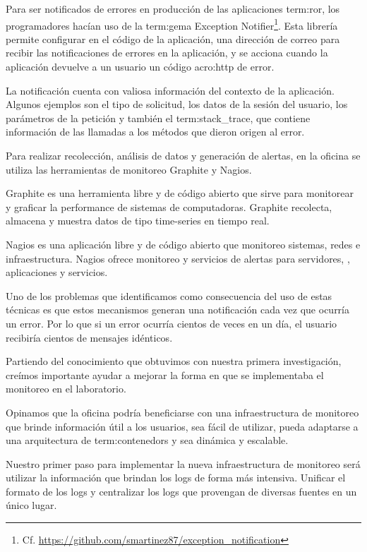 Para ser notificados de errores en producción de las aplicaciones
\gls{term:ror}, los programadores hacían uso de la \gls{term:gema} Exception
Notifier\footnote{Cf.
\url{https://github.com/smartinez87/exception_notification}}. Esta librería
permite configurar en el código de la aplicación, una dirección de correo para
recibir las notificaciones de errores en la aplicación, y se acciona cuando la
aplicación devuelve a un usuario un código \gls{acro:http} de error.

La notificación cuenta con valiosa información del contexto de la aplicación.
Algunos ejemplos son el tipo de solicitud, los datos de la sesión del usuario,
los parámetros de la petición y también el \gls{term:stack_trace}, que contiene
información de las llamadas a los métodos que dieron origen al error.

Para realizar recolección, análisis de datos y generación de alertas, en la
oficina se utiliza las herramientas de monitoreo Graphite y Nagios.

Graphite es una herramienta libre y de código abierto que sirve para monitorear
y graficar la performance de sistemas de computadoras. Graphite recolecta,
almacena y muestra datos de tipo time-series en tiempo real.

Nagios es una aplicación libre y de código abierto que monitoreo sistemas,
redes e infraestructura. Nagios ofrece monitoreo y servicios de alertas para
servidores, , aplicaciones y servicios.

Uno de los problemas que identificamos como consecuencia del uso de estas
técnicas es que estos mecanismos generan una notificación cada vez que ocurría
un error. Por lo que si un error ocurría cientos de veces en un día, el usuario
recibiría cientos de mensajes idénticos.

Partiendo del conocimiento que obtuvimos con nuestra primera investigación,
creímos importante ayudar a mejorar la forma en que se implementaba el
monitoreo en el laboratorio.

Opinamos que la oficina podría beneficiarse con una infraestructura de
monitoreo que brinde información útil a los usuarios, sea fácil de utilizar,
pueda adaptarse a una arquitectura de \glspl{term:contenedor} y sea dinámica y
escalable.

Nuestro primer paso para implementar la nueva infraestructura de monitoreo será
utilizar la información que brindan los logs de forma más intensiva. Unificar
el formato de los logs y centralizar los logs que provengan de diversas fuentes
en un único lugar.

